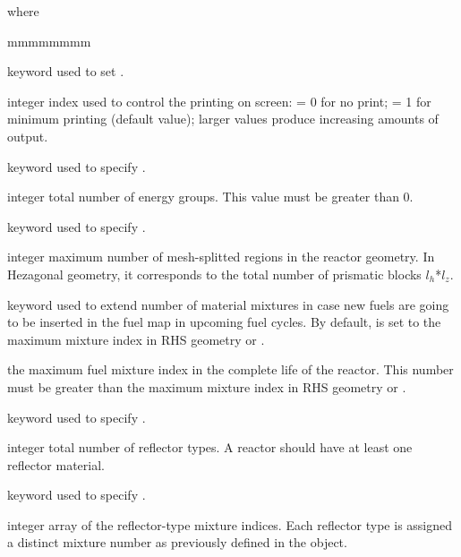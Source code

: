 \noindent where
\begin{ListeDeDescription}{mmmmmmmm}

\item[\moc{EDIT}] keyword used to set .

\item[\dusa{iprint}] integer index used to control the printing on
screen: = 0 for no print; = 1 for minimum printing (default value);
larger values produce increasing amounts of output.

\item[\moc{NGRP}] keyword used to specify .

\item[\dusa{ngrp}] integer total number of energy groups.
This value must be greater than 0.

\item[\moc{MAXR}] keyword used to specify .

\item[\dusa{maxreg}] integer maximum number of mesh-splitted
regions in the reactor geometry. In  Hezagonal geometry, it corresponds to
the total number of prismatic blocks $l_{h}$*$l_{z}$.

\item[\moc{NMIX}] keyword used to extend number of material mixtures in case new fuels are going to be inserted in
the fuel map in upcoming fuel cycles. By default,  is set to the maximum mixture index in RHS geometry  or .

\item[\dusa{nmixt}] the maximum fuel mixture index in the complete life of the reactor. This number must be greater
than the maximum mixture index in RHS geometry  or .

\item[\moc{NREFL}] keyword used to specify .

\item[\dusa{nrefl}] integer total number of reflector types.
A reactor should have at least one reflector material.

\item[\moc{RMIX}] keyword used to specify .

\item[\dusa{mixr}] integer array of the reflector-type mixture indices.
Each reflector type is assigned a distinct mixture number as
previously defined in the  object.


\end{ListeDeDescription}

